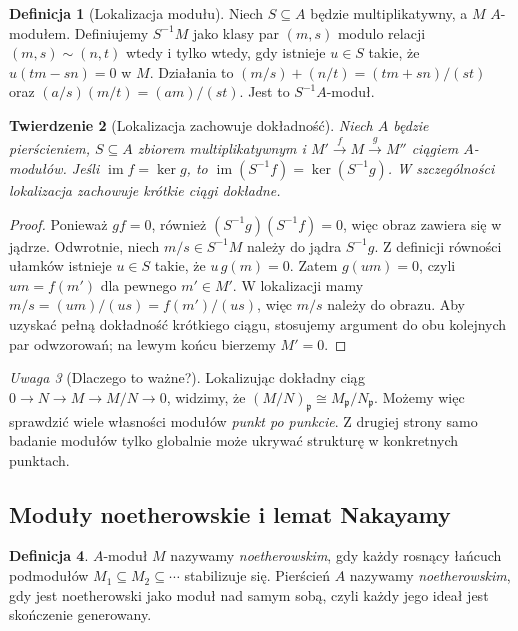 \documentclass[11pt,a4paper,openany]{report}
\numberwithin{equation}{section}
\theoremstyle{plain}
\newtheorem{twierdzenie}{Twierdzenie}[section]
\theoremstyle{definition}
\newtheorem{definicja}[twierdzenie]{Definicja}
\theoremstyle{remark}
\newtheorem{uwaga}[twierdzenie]{Uwaga}
\newcommand{\im}{\operatorname{im}}
\begin{document}
\begin{definicja}[Lokalizacja modułu]
Niech $S\subseteq A$ będzie multiplikatywny, a $M$
$A$-modułem. Definiujemy $S^{-1}M$ jako klasy par
$(m,s)$ modulo relacji
$(m,s)\sim(n,t)$ wtedy i tylko wtedy, gdy istnieje
$u\in S$ takie, że $u(tm-sn)=0$ w $M$.
Działania to $(m/s)+(n/t)=(tm+sn)/(st)$ oraz
$(a/s)(m/t)=(am)/(st)$. Jest to $S^{-1}A$-moduł.
\end{definicja}

\begin{twierdzenie}[Lokalizacja zachowuje dokładność]
\label{tw:loc-exact}
Niech $A$ będzie pierścieniem, $S\subseteq A$ zbiorem
multiplikatywnym i
$M'\xrightarrow{f}M\xrightarrow{g}M''$ ciągiem
$A$-modułów. Jeśli $\im f=\ker g$, to
$\im(S^{-1}f)=\ker(S^{-1}g)$. W szczególności
lokalizacja zachowuje krótkie ciągi dokładne.
\end{twierdzenie}
\begin{proof}
Ponieważ $gf=0$, również $(S^{-1}g)(S^{-1}f)=0$,
więc obraz zawiera się w jądrze. Odwrotnie,
niech $m/s\in S^{-1}M$ należy do jądra
$S^{-1}g$. Z definicji równości ułamków istnieje
$u\in S$ takie, że $u\,g(m)=0$. Zatem
$g(um)=0$, czyli $um=f(m')$ dla pewnego $m'\in M'$.
W lokalizacji mamy
$m/s=(um)/(us)=f(m')/(us)$, więc $m/s$
należy do obrazu. Aby uzyskać pełną dokładność
krótkiego ciągu, stosujemy argument do obu kolejnych
par odwzorowań; na lewym końcu bierzemy $M'=0$.
\end{proof}

\begin{uwaga}[Dlaczego to ważne?]
Lokalizując dokładny ciąg
$0\to N\to M\to M/N\to0$,
widzimy, że $(M/N)_{\mathfrak p}\cong
M_{\mathfrak p}/N_{\mathfrak p}$. Możemy więc
sprawdzić wiele własności modułów \emph{punkt po punkcie}.
Z drugiej strony samo badanie modułów tylko globalnie
może ukrywać strukturę w konkretnych punktach.
\end{uwaga}

\subsection{Moduły noetherowskie i lemat Nakayamy}
\begin{definicja}
$A$-moduł $M$ nazywamy \emph{noetherowskim},
gdy każdy rosnący łańcuch podmodułów
$M_1\subseteq M_2\subseteq\cdots$ stabilizuje się.
Pierścień $A$ nazywamy \emph{noetherowskim},
gdy jest noetherowski jako moduł nad samym sobą,
czyli każdy jego ideał jest skończenie generowany.
\end{definicja}
\end{document}
